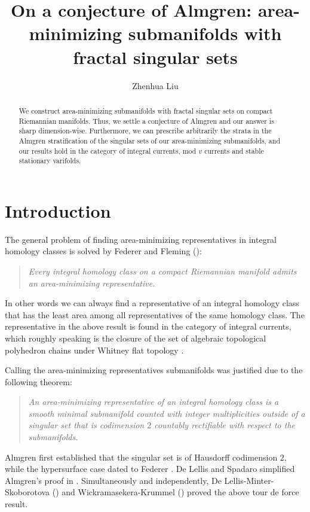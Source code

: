 \documentclass[11pt,a4paper]{amsart}
\title[Fractal singular sets]{On a conjecture of Almgren: area-minimizing submanifolds with fractal singular sets}
\author{Zhenhua Liu}
\numberwithin{equation}{section}
\theoremstyle{plain}
\theoremstyle{definition}
\numberwithin{equation}{subsection}
\begin{document}
	\setlength{\abovedisplayskip}{5pt}
	\setlength{\belowdisplayskip}{5pt}
	\setlength{\abovedisplayshortskip}{5pt}
	\setlength{\belowdisplayshortskip}{5pt}
	\maketitle\vspace{-3em}
	\begin{abstract}
	We construct area-minimizing submanifolds with fractal singular sets on compact Riemannian manifolds. Thus, we settle a conjecture of Almgren and our answer is sharp dimension-wise. Furthermore, we can prescribe arbitrarily the strata in the Almgren stratification of the singular sets of our area-minimizing submanifolds, and our results hold in the category of integral currents, mod $v$ currents and stable stationary varifolds. 
	\end{abstract}
	\section{Introduction}
		The general problem of finding area-minimizing representatives in integral homology classes is solved by Federer and Fleming (\cite{FF}):
	\begin{quote}
		\emph{Every integral homology class on a compact Riemannian manifold admits an area-minimizing representative.}
	\end{quote}
	In other words we can always find a representative of an integral homology class that has the least area among all representatives of the same homology class. The representative in the above result is found in the category of integral currents, which roughly speaking is the closure of the set of algebraic topological polyhedron chains under Whitney flat topology \cite{FF}.
	
	Calling the area-minimizing representatives submanifolds was justified due to the following theorem:
	\begin{quote}
		\emph{An area-minimizing representative of an integral homology class is a smooth minimal submanifold counted with integer multiplicities outside of a singular set that is codimension $2$ countably rectifiable with respect to the submanifolds.}
	\end{quote}Almgren \cite{FA} first established that the singular set is of Hausdorff codimension $2,$ while the hypersurface case dated to  Federer \cite{HFts}. De Lellis and Spadaro simplified Almgren's proof in \cite{DS1,DS2,DS3}. Simultaneously and independently, De Lellis-Minter-Skoborotova 
	(\cite{DMS1,DMS2,DMS3}) and Wickramasekera-Krummel (\cite{BK1,BK2,BK3})  proved the above tour de force result. 
  
\end{document}
